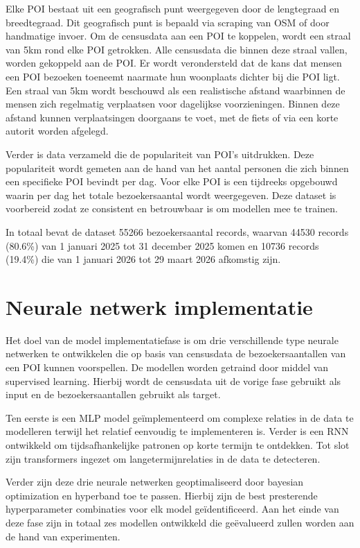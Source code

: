Elke POI bestaat uit een geografisch punt weergegeven door de lengtegraad en breedtegraad. Dit geografisch punt is bepaald via scraping van OSM of door handmatige invoer. Om de censusdata aan een POI te koppelen, wordt een straal van 5km rond elke POI getrokken. Alle censusdata die binnen deze straal vallen, worden gekoppeld aan de POI. Er wordt verondersteld dat de kans dat mensen een POI bezoeken toeneemt naarmate hun woonplaats dichter bij die POI ligt. Een straal van 5km wordt beschouwd als een realistische afstand waarbinnen de mensen zich regelmatig verplaatsen voor dagelijkse voorzieningen. Binnen deze afstand kunnen verplaatsingen doorgaans te voet, met de fiets of via een korte autorit worden afgelegd.

Verder is data verzameld die de populariteit van POI's uitdrukken. Deze populariteit wordt gemeten aan de hand van het aantal personen die zich binnen een specifieke POI bevindt per dag. Voor elke POI is een tijdreeks opgebouwd waarin per dag het totale bezoekersaantal wordt weergegeven. Deze dataset is voorbereid zodat ze consistent en betrouwbaar is om modellen mee te trainen.

In totaal bevat de dataset 55266 bezoekersaantal records, waarvan 44530 records (80.6\%) van 1 januari 2025 tot 31 december 2025 komen en 10736 records (19.4\%) die van 1 januari 2026 tot 29 maart 2026 afkomstig zijn.

\section{Neurale netwerk implementatie}

Het doel van de model implementatiefase is om drie verschillende type neurale netwerken te ontwikkelen die op basis van censusdata de bezoekersaantallen van een POI kunnen voorspellen. De modellen worden getraind door middel van supervised learning. Hierbij wordt de censusdata uit de vorige fase gebruikt als input en de bezoekersaantallen gebruikt als target.

Ten eerste is een MLP model geïmplementeerd om complexe relaties in de data te modelleren terwijl het relatief eenvoudig te implementeren is. Verder is een RNN ontwikkeld om tijdsafhankelijke patronen op korte termijn te ontdekken. Tot slot zijn transformers ingezet om langetermijnrelaties in de data te detecteren.

Verder zijn deze drie neurale netwerken geoptimaliseerd door bayesian optimization en hyperband toe te passen. Hierbij zijn de best presterende hyperparameter combinaties voor elk model geïdentificeerd. Aan het einde van deze fase zijn in totaal zes modellen ontwikkeld die geëvalueerd zullen worden aan de hand van experimenten.

